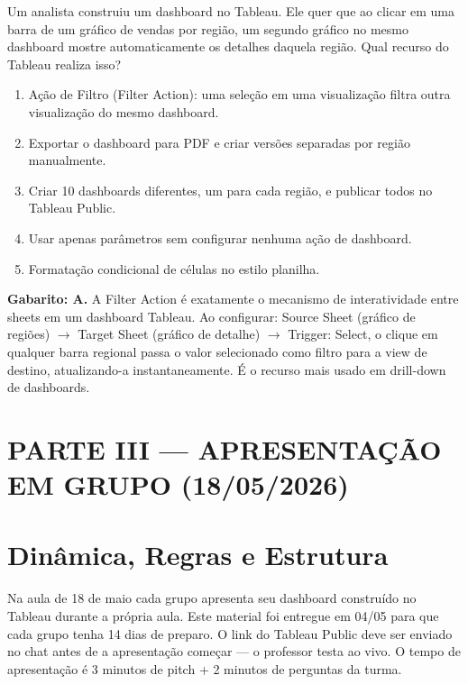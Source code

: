 \begin{SolvedBox}[title=Questão 10 (Prova II Chamada) --- Tableau: Ação de Filtro (1{,}0 pt)]
Um analista construiu um dashboard no Tableau. Ele quer que ao clicar em uma barra de um gráfico de vendas por região, um segundo gráfico no mesmo dashboard mostre automaticamente os detalhes daquela região. Qual recurso do Tableau realiza isso?
\begin{enumerate}[label=\Alph*)]
  \item Ação de Filtro (Filter Action): uma seleção em uma visualização filtra outra visualização do mesmo dashboard.
  \item Exportar o dashboard para PDF e criar versões separadas por região manualmente.
  \item Criar 10 dashboards diferentes, um para cada região, e publicar todos no Tableau Public.
  \item Usar apenas parâmetros sem configurar nenhuma ação de dashboard.
  \item Formatação condicional de células no estilo planilha.
\end{enumerate}
\end{SolvedBox}

\textbf{Gabarito: A.} A Filter Action é exatamente o mecanismo de interatividade entre sheets em um dashboard Tableau. Ao configurar: Source Sheet (gráfico de regiões) $\to$ Target Sheet (gráfico de detalhe) $\to$ Trigger: Select, o clique em qualquer barra regional passa o valor selecionado como filtro para a view de destino, atualizando-a instantaneamente. É o recurso mais usado em drill-down de dashboards.

\section*{\Large PARTE III --- APRESENTAÇÃO EM GRUPO (18/05/2026)}

\section{Dinâmica, Regras e Estrutura}

Na aula de 18 de maio cada grupo apresenta seu dashboard construído no Tableau durante a própria aula. Este material foi entregue em 04/05 para que cada grupo tenha 14 dias de preparo. O link do Tableau Public deve ser enviado no chat antes de a apresentação começar --- o professor testa ao vivo. O tempo de apresentação é 3 minutos de pitch + 2 minutos de perguntas da turma.

